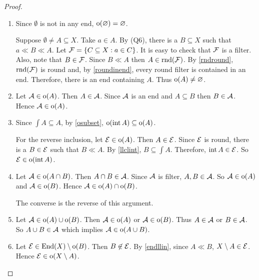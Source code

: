 \begin{proof}
	\leavevmode
	\begin{enumerate}
		\item
			Since \( \emptyset \) is not in any end, \( \operatorname{o}(\varnothing) = \varnothing \).
		
			Suppose \( \emptyset \neq A \subseteq X \).  Take \( a \in A \).  By (Q6), there is a \( B \subseteq X \) such that \( a \ll B \ll A \).  Let \( \mathcal{F} = \{ C \subseteq X : a \in C \} \).  It is easy to check that \( \mathcal{F} \) is a filter.  Also, note that \( B \in \mathcal{F} \).  Since \( B \ll A \) then \( A \in \operatorname{rnd}(\mathcal{F}) \).  By \ref{rndround}, \( \operatorname{rnd}(\mathcal{F}) \) is round and, by \ref{roundinend}, every round filter is contained in an end.  Therefore, there is an end containing \( A \).  Thus \( \operatorname{o}(A) \neq \varnothing \).
		
		\item
			Let \( \mathcal{A} \in \operatorname{o}(A) \).  Then \( A \in \mathcal{A} \).  Since \( \mathcal{A} \) is an end and \( A \subseteq B \) then \( B \in \mathcal{A} \).  Hence \( \mathcal{A} \in \operatorname{o}(A) \).
			
		\item
			Since \( \int A \subseteq A \), by \ref{osubset}, \( \operatorname{o}(\operatorname{int} A) \subseteq \operatorname{o}(A) \).
			
			For the reverse inclusion, let \( \mathcal{E} \in \operatorname{o}(A) \).  Then \( A \in \mathcal{E} \).  Since \( \mathcal{E} \) is round, there is a \( B \in \mathcal{E} \) such that \( B \ll A \).  By \ref{llclint}, \( B \subseteq \int{A} \).  Therefore, \( \operatorname{int}{A} \in \mathcal{E} \).  So \( \mathcal{E} \in \operatorname{o}(\operatorname{int}{A}) \).
		
		\item
			Let \( \mathcal{A} \in \operatorname{o}(A \cap B) \).  Then \( A \cap B \in \mathcal{A} \).  Since \( \mathcal{A} \) is filter, \( A,B \in \mathcal{A} \).  So \( \mathcal{A} \in \operatorname{o}(A) \) and \( \mathcal{A} \in \operatorname{o}(B) \).  Hence \( \mathcal{A} \in \operatorname{o}(A) \cap \operatorname{o}(B) \).
	
			The converse is the reverse of this argument.
			
		\item
			Let \( \mathcal{A} \in \operatorname{o}(A) \cup \operatorname{o}(B) \).  Then \( \mathcal{A} \in \operatorname{o}(A) \) or \( \mathcal{A} \in \operatorname{o}(B) \).  Thus \( A \in \mathcal{A} \) or \( B \in \mathcal{A} \).  So \( A \cup B \in \mathcal{A} \) which implies \( \mathcal{A} \in \operatorname{o}(A \cup B) \).
			
		\item
			Let \( \mathcal{E} \in \operatorname{End}(X) \setminus \operatorname{o}(B) \).  Then \( B \not\in \mathcal{E} \).  By \ref{endllin}, since \( A \ll B \), \( X \setminus A \in \mathcal{E} \).  Hence \( \mathcal{E} \in \operatorname{o}(X \setminus A) \).
	\end{enumerate}
\end{proof}

